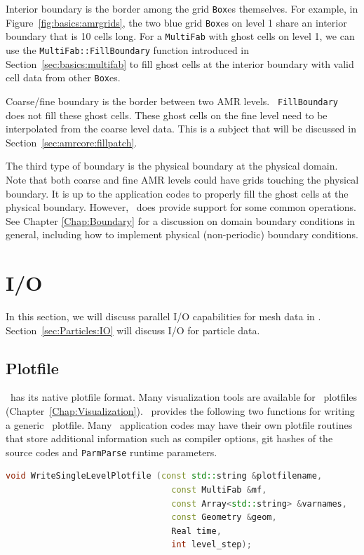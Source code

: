 {{Interior boundary is the border among the grid {\tt Box}es themselves.
For example, in Figure~\ref{fig:basics:amrgrids}, the two blue grid
{\tt Box}es on level 1 share an interior boundary that is 10 cells
long.  For a {\tt MultiFab} with ghost cells on level 1, we can use
the {\tt MultiFab::FillBoundary} function introduced in
Section~\ref{sec:basics:multifab} to fill ghost cells at the interior
boundary with valid cell data from other {\tt Box}es.

Coarse/fine boundary is the border between two AMR levels.  {\tt
FillBoundary} does not fill these ghost cells.  These ghost cells on
the fine level need to be interpolated from the coarse level data.
This is a subject that will be discussed in
Section~\ref{sec:amrcore:fillpatch}. 

The third type of boundary is the physical boundary at the physical
domain.  Note that both coarse and fine AMR levels could have grids
touching the physical boundary.  It is up to the application codes to
properly fill the ghost cells at the physical boundary.  However,
\amrex\ does provide support for some common operations.  
See Chapter \ref{Chap:Boundary} for a discussion on domain
boundary conditions in general, including how to implement
physical (non-periodic) boundary conditions.

\section{I/O}

In this section, we will discuss parallel I/O capabilities for mesh
data in \amrex.  Section~\ref{sec:Particles:IO} will discuss I/O for
particle data.

\subsection{Plotfile}

\amrex\ has its native plotfile format.  Many visualization tools are
available for \amrex\ plotfiles
(Chapter~\ref{Chap:Visualization}).  \amrex\ provides the following
two functions for writing a generic \amrex\ plotfile.  Many \amrex\
application codes may have their own plotfile routines that store
additional information such as compiler options, git hashes of the
source codes and {\tt ParmParse} runtime parameters.
\begin{lstlisting}[language=cpp]
  void WriteSingleLevelPlotfile (const std::string &plotfilename,
                                 const MultiFab &mf,
                                 const Array<std::string> &varnames,
                                 const Geometry &geom,
                                 Real time,
                                 int level_step);


\end{lstlisting}}}
